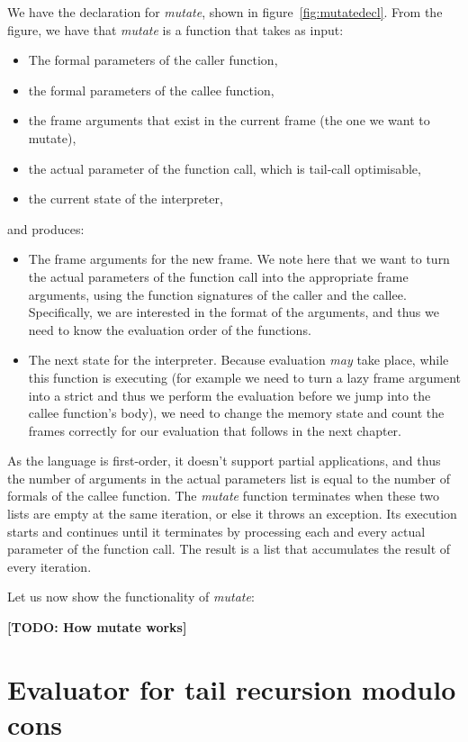\documentclass[diploma]{softlab-thesis}
\begin{document}
We have the declaration for \textit{mutate}, shown in figure~\ref{fig:mutatedecl}.
From the figure, we have that \textit{mutate} is a function that takes as input:
\begin{itemize}
  \item The formal parameters of the caller function,
  \item the formal parameters of the callee function,
  \item the frame arguments that exist in the current frame (the one we want to mutate),
  \item the actual parameter of the function call, which is tail-call optimisable,
  \item the current state of the interpreter, 
\end{itemize}
and produces:
\begin{itemize}
  \item The frame arguments for the new frame. We note here that we want to turn the actual parameters 
  of the function call into the appropriate frame arguments, using the function signatures of the caller and the callee.
  Specifically, we are interested in the format of the arguments, and thus we need to know the evaluation 
  order of the functions.
  \item The next state for the interpreter. Because evaluation \textit{may} take place, while this function is executing 
  (for example we need to turn a lazy frame argument into a strict and thus we perform the evaluation before 
  we jump into the callee function's body), we need to change the memory state and count the frames correctly
  for our evaluation that follows in the next chapter.
\end{itemize}

As the language is first-order, it doesn't support partial applications, and thus the number of arguments 
in the actual parameters list is equal to the number of formals of the callee function. The \textit{mutate} function 
terminates when these two lists are empty at the same iteration, or else it throws an exception. Its execution starts 
and continues until it terminates by processing each and every actual parameter of the function call. The result is 
a list that accumulates the result of every iteration. 
\newline
\par Let us now show the functionality of \textit{mutate}:

\textbf{[TODO: How mutate works]}


\section {Evaluator for tail recursion modulo cons}
\label{sec:tco-modulo-cons-eval}
\end{document}
